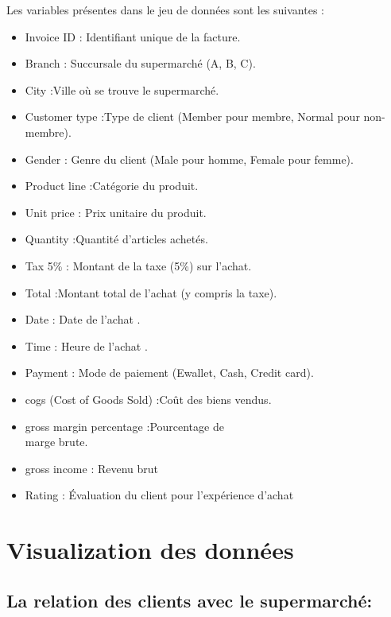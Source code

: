 \documentclass[
]{article}
\begin{document}
Les variables présentes dans le jeu de données sont les suivantes :

\begin{itemize}
\item
  Invoice ID : Identifiant unique de la facture.
\item
  Branch : Succursale du supermarché (A, B, C).
\item
  City :Ville où se trouve le supermarché.
\item
  Customer type :Type de client (Member pour membre, Normal pour
  non-membre).
\item
  Gender : Genre du client (Male pour homme, Female pour femme).
\item
  Product line :Catégorie du produit.
\item
  Unit price : Prix unitaire du produit.
\item
  Quantity :Quantité d'articles achetés.
\item
  Tax 5\% : Montant de la taxe (5\%) sur l'achat.
\item
  Total :Montant total de l'achat (y compris la taxe).
\item
  Date : Date de l'achat .
\item
  Time : Heure de l'achat .
\item
  Payment : Mode de paiement (Ewallet, Cash, Credit card).
\item
  cogs (Cost of Goods Sold) :Coût des biens vendus.
\item
  gross margin percentage :Pourcentage de\\
  marge brute.
\item
  gross income : Revenu brut
\item
  Rating : Évaluation du client pour l'expérience d'achat
\end{itemize}

\hypertarget{visualization-des-donnuxe9es}{%
\section{Visualization des données}\label{visualization-des-donnuxe9es}}

\hypertarget{la-relation-des-clients-avec-le-supermarchuxe9}{%
\subsection{La relation des clients avec le
supermarché:}\label{la-relation-des-clients-avec-le-supermarchuxe9}}
\end{document}

